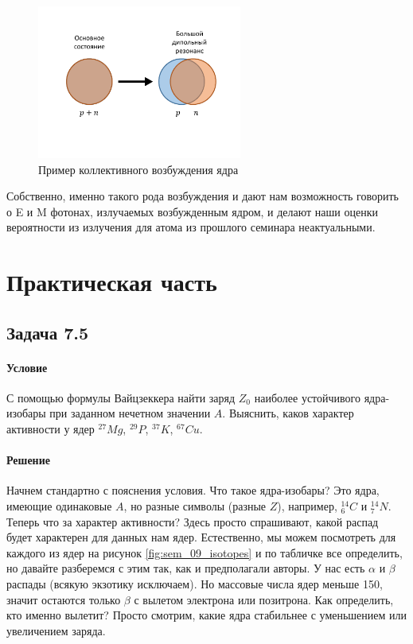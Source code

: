 \documentclass[12pt]{article}
\begin{document}
\begin{figure}[H]
    \centering
    \includegraphics[width=0.6\textwidth,keepaspectratio]{Seminar_09/pics/pic_dipole_resonance.pdf}
    \caption{Пример коллективного возбуждения ядра}
    \label{fig:sem_09_dipole_res}
\end{figure}

\noindent
Собственно, именно такого рода возбуждения и дают нам возможность говорить о E и M фотонах, излучаемых  возбужденным ядром, и делают наши оценки вероятности из излучения для атома из прошлого семинара неактуальными.

\section{Практическая часть}
\subsection{Задача 7.5}
\label{task_1}
\paragraph{Условие}
С помощью формулы Вайцзеккера найти заряд $Z_0$ наиболее устойчивого ядра-изобары при заданном нечетном значении $A$. Выяснить, каков характер активности у ядер ${}^{27}Mg$, ${}^{29}P$, ${}^{37}K$, ${}^{67}Cu$.
\paragraph{Решение}
Начнем стандартно с пояснения условия. Что такое ядра-изобары? Это ядра, имеющие одинаковые $A$, но разные символы (разные $Z$), например, ${}^{14}_6C$ и ${}^{14}_7N$. Теперь что за характер активности? Здесь просто спрашивают, какой распад будет характерен для данных нам ядер. Естественно, мы можем посмотреть для каждого из ядер на рисунок \ref{fig:sem_09_isotopes} и по табличке все определить, но давайте разберемся с этим так, как и предполагали авторы. У нас есть $\alpha$ и $\beta$ распады (всякую экзотику исключаем). Но массовые числа ядер меньше 150, значит остаются только $\beta$ с вылетом электрона или позитрона. Как определить, кто именно вылетит? Просто смотрим, какие ядра стабильнее с уменьшением или увеличением заряда. 
\end{document}
